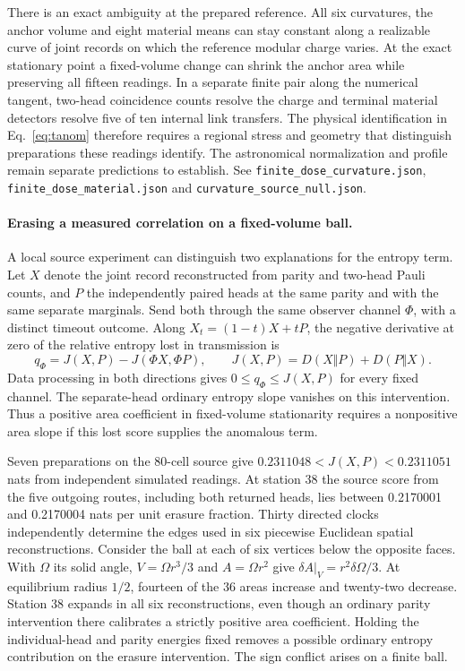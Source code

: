 \documentclass[11pt]{article}
\begin{document}
There is an exact ambiguity at the prepared reference. All six
curvatures, the anchor volume and eight material means can stay
constant along a realizable curve of joint records on which the
reference modular charge varies. At the exact stationary point a
fixed-volume change can shrink the anchor area while preserving all
fifteen readings. In a separate finite pair along the numerical
tangent, two-head coincidence counts resolve the charge and terminal
material detectors resolve five of ten internal link transfers.
The physical identification in Eq.~\eqref{eq:tanom} therefore requires
a regional stress and geometry that distinguish preparations these
readings identify. The astronomical normalization and profile remain
separate predictions to establish. See
\texttt{finite\_dose\_curvature.json},
\texttt{finite\_dose\_material.json} and
\texttt{curvature\_source\_null.json}.

\paragraph{Erasing a measured correlation on a fixed-volume ball.}
A local source experiment can distinguish two explanations for the
entropy term. Let \(X\) denote the joint record reconstructed from
parity and two-head Pauli counts, and \(P\) the independently paired
heads at the same parity and with the same separate marginals. Send
both through the same observer channel \(\Phi\), with a distinct
timeout outcome. Along \(X_t=(1-t)X+tP\), the negative derivative at
zero of the relative entropy lost in transmission is
\[
 q_\Phi=J(X,P)-J(\Phi X,\Phi P),\qquad
 J(X,P)=D(X\Vert P)+D(P\Vert X).
\]
Data processing in both directions gives \(0\le q_\Phi\le J(X,P)\)
for every fixed channel. The separate-head ordinary entropy slope
vanishes on this intervention. Thus a positive area coefficient in
fixed-volume stationarity requires a nonpositive area slope if this
lost score supplies the anomalous term.

Seven preparations on the 80-cell source give
\(0.2311048<J(X,P)<0.2311051\) nats from independent simulated
readings. At station 38 the source score from the five outgoing
routes, including both returned heads, lies between 0.2170001
and 0.2170004 nats per unit erasure fraction.
Thirty directed clocks independently determine the edges used in
six piecewise Euclidean spatial reconstructions. Consider the ball
at each of six vertices below the opposite faces. With
\(\Omega\) its solid angle, \(V=\Omega r^3/3\) and \(A=\Omega r^2\)
give \(\delta A|_V=r^2\delta\Omega/3\). At equilibrium radius
\(1/2\), fourteen of the 36 areas increase and twenty-two decrease.
Station 38 expands in all six reconstructions, even though an
ordinary parity intervention there calibrates a strictly positive
area coefficient. Holding the individual-head and parity energies
fixed removes a possible ordinary entropy contribution on the
erasure intervention. The sign conflict arises on a finite ball.
\end{document}
